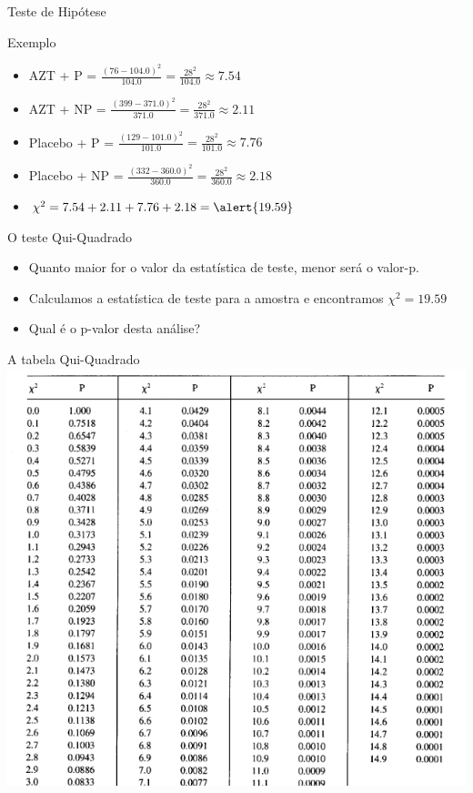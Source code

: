 \documentclass{beamer}
\begin{document}
\begin{frame}{Teste de Hipótese}
  \begin{exampleblock}{Exemplo}
    \begin{itemize}
    \item AZT + P = $\frac{(76 - 104.0)^2}{104.0} = \frac{28^2}{104.0}
      \approx 7.54$
    \item AZT + NP = $\frac{(399 - 371.0)^2}{371.0} =
      \frac{28^2}{371.0} \approx 2.11$
    \item Placebo + P = $\frac{(129 - 101.0)^2}{101.0} =
      \frac{28^2}{101.0} \approx 7.76$
    \item Placebo + NP = $\frac{(332 - 360.0)^2}{360.0} =
      \frac{28^2}{360.0} \approx 2.18$
    \item $\chi^2 = 7.54 + 2.11 + 7.76 + 2.18 = \alert{19.59}$
    \end{itemize}
  \end{exampleblock}
\end{frame}

\begin{frame}{O teste Qui-Quadrado}
  \begin{itemize}
  \item Quanto \alert{maior} for o valor da estatística de teste,
    \alert{menor} será o valor-p.
  \item Calculamos a estatística de teste para a amostra e encontramos
    $\chi^2 = 19.59$
  \item Qual é o p-valor desta análise?
  \end{itemize}
\end{frame}

\begin{frame}{A tabela Qui-Quadrado}
\includegraphics[height=\textheight]{Cap26-27/qui-quadrado1}
\end{frame}
\end{document}

